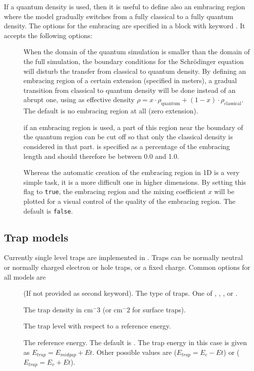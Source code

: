 If a quantum density is used, then it is useful to define also an embracing region where the model gradually switches from a fully classical to a fully quantum density.
The options for the embracing are specified in a block with keyword . It accepts the following options:
\begin{description}
\item[ ] When the domain of the quantum simulation is smaller than the domain of the full simulation, the boundary conditions for the Schr\"odinger equation will disturb the transfer from classical to quantum density.
By defining an embracing region of a certain extension (specified in meters), a gradual transition from classical to quantum density will be done instead of an abrupt one, using as effective density $\rho = x\cdot\rho_{\mathrm{quantum}} + (1-x)\cdot\rho_{\mathrm{classical}}$. The default is no embracing region at all (zero extension).

\item[ ] if an embracing region is used, a part of this region near the boundary of the quantum region can be cut off so that only the classical density is considered in that part.  is specified as a percentage of the embracing length and should therefore be between 0.0 and 1.0.

\item[ ] Whereas the automatic creation of the embracing region in 1D is a very simple task, it is a more difficult one in higher dimensions.
By setting this flag to \texttt{true}, the embracing region and the mixing coefficient $x$ will be plotted for a visual control of the quality of the embracing region.
The default is \texttt{false}.
\end{description}


\subsection{Trap models}

Currently single level traps are implemented in \TiberCAD{}.
Traps can be normally neutral or normally charged electron or hole traps, or a fixed charge.
Common options for all models are
\begin{description}
\item[] (If not provided as second keyword). The type of traps. One of , , ,  or .
\item[] The trap density in cm$^-3$ (or cm$^-2$ for surface traps).
\item[] The trap level with respect to a reference energy.
\item[] The reference energy. The default is . The trap energy in this case is given as $E_{trap} = E_{midgap} + Et$. Other possible values are  ($E_{trap} = E_c - Et$) or  ($E_{trap} = E_v + Et$).
\end{description}

